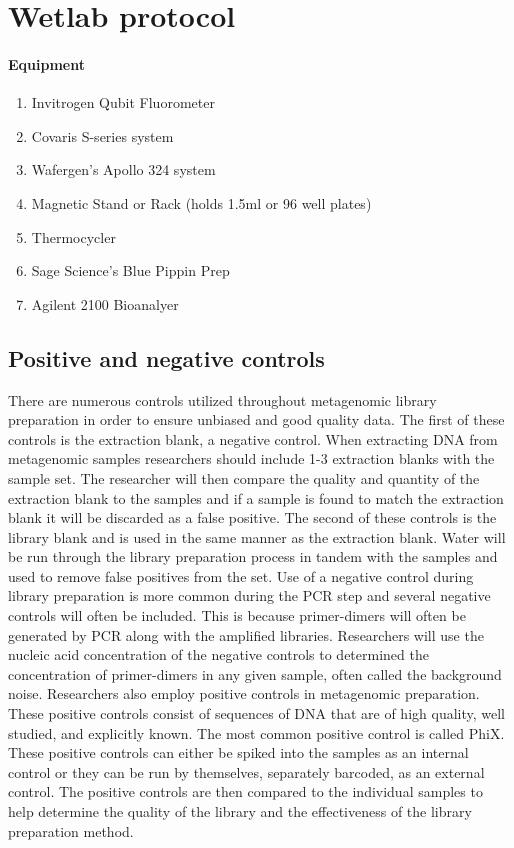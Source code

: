\documentclass[graybox]{svmult}
\begin{document}
\section{Wetlab protocol}

\paragraph{Equipment}
\begin{enumerate}
\item{    Invitrogen Qubit Fluorometer}
\item{      Covaris S-series system}
\item{      Wafergen’s Apollo 324 system}
\item{      Magnetic Stand or Rack (holds 1.5ml or 96 well plates)}
\item{      Thermocycler}
\item{      Sage Science’s Blue Pippin Prep}
\item{      Agilent 2100 Bioanalyer}
\end{enumerate}

\subsection{Positive and negative controls }

There are numerous controls utilized throughout metagenomic library preparation in order to ensure unbiased and good quality data. The first of these controls is the extraction blank, a negative control. When extracting DNA from metagenomic samples researchers should include 1-3 extraction blanks with the sample set. The researcher will then compare the quality and quantity of the extraction blank to the samples and if a sample is found to match the extraction blank it will be discarded as a false positive.
%
The second of these controls is the library blank and is used in the same manner as the extraction blank. Water will be run through the library preparation process in tandem with the samples and used to remove false positives from the set.
%
Use of a negative control during library preparation is more common during the PCR step and several negative controls will often be included. This is because primer-dimers will often be generated by PCR along with the amplified libraries. Researchers will use the nucleic acid concentration of the negative controls to determined the concentration of primer-dimers in any given sample, often called the background noise.
%
Researchers also employ positive controls in metagenomic preparation. These positive controls consist of sequences of DNA that are of high quality, well studied, and explicitly known. The most common positive control is called PhiX. These positive controls can either be spiked into the samples as an internal control or they can be run by themselves, separately barcoded, as an external control. The positive controls are then compared to the individual samples to help determine the quality of the library and the effectiveness of the library preparation method. 
\end{document}
